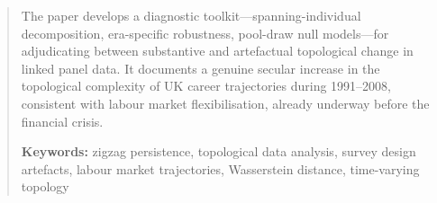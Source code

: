 \documentclass[12pt, a4paper]{article}
\begin{document}
\begin{abstract}
The paper develops a diagnostic toolkit---spanning-individual decomposition,
era-specific robustness, pool-draw null models---for adjudicating between
substantive and artefactual topological change in linked panel data.
It documents a genuine secular increase in the topological complexity of UK
career trajectories during 1991--2008, consistent with labour market
flexibilisation, already underway before the financial crisis.

\medskip
\noindent\textbf{Keywords:} zigzag persistence, topological data analysis,
survey design artefacts, labour market trajectories, Wasserstein distance,
time-varying topology

\end{abstract}

\newpage
\tableofcontents
\newpage




\end{document}
